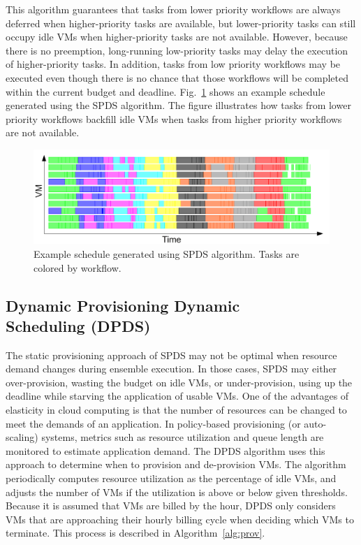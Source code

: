 \documentclass{sig-alternate}
\begin{document}
This algorithm guarantees that tasks from lower priority workflows are
always deferred when higher-priority tasks are available, but lower-priority
tasks can still occupy idle VMs when higher-priority tasks are not available. 
However, because there is no preemption, long-running low-priority tasks may delay 
the execution of higher-priority tasks. In addition, tasks from low priority 
workflows may be executed even though there is no chance that those workflows 
will be completed within the current budget and deadline. Fig.~\ref{fig:spds-example} 
shows an example schedule generated using the SPDS algorithm. The figure illustrates 
how tasks from lower priority workflows backfill idle VMs when tasks from higher 
priority workflows are not available.

\begin{figure}[htb] 
\centering
\includegraphics[width=1.0\columnwidth]{figures/spds-gantt}
 \caption{Example schedule generated using SPDS algorithm. Tasks are colored by workflow. }
\label{fig:spds-example}
\end{figure}

\subsection{Dynamic Provisioning Dynamic \\Scheduling (DPDS)}
 
The static provisioning approach of SPDS may not be optimal when resource demand
changes during ensemble execution. In those cases, SPDS may either over-provision, 
wasting the budget on idle VMs, or under-provision, using up the deadline while starving 
the application of usable VMs. One of the advantages of elasticity in cloud computing 
is that the number of resources can be changed to meet the demands of an application.
In policy-based provisioning (or auto-scaling) systems, metrics such as resource 
utilization and queue length are monitored to estimate application demand. The DPDS 
algorithm uses this approach to determine when to provision and de-provision VMs. The 
algorithm periodically computes resource utilization as the percentage of idle VMs, and
adjusts the number of VMs if the utilization is above or below given thresholds.
Because it is assumed that VMs are billed by the hour, DPDS only considers VMs that are
approaching their hourly billing cycle when deciding which VMs to terminate. This process
is described in Algorithm~\ref{alg:prov}.
\end{document}
